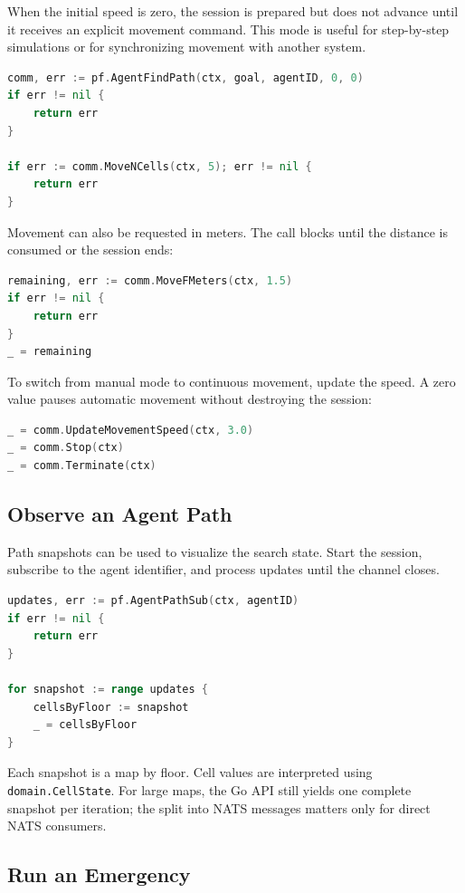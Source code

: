 \documentclass[12pt,a4paper]{report}
\begin{document}
When the initial speed is zero, the session is prepared but does not advance
until it receives an explicit movement command. This mode is useful for
step-by-step simulations or for synchronizing movement with another system.

\begin{lstlisting}[language=Go]
comm, err := pf.AgentFindPath(ctx, goal, agentID, 0, 0)
if err != nil {
    return err
}

if err := comm.MoveNCells(ctx, 5); err != nil {
    return err
}
\end{lstlisting}

Movement can also be requested in meters. The call blocks until the distance is
consumed or the session ends:

\begin{lstlisting}[language=Go]
remaining, err := comm.MoveFMeters(ctx, 1.5)
if err != nil {
    return err
}
_ = remaining
\end{lstlisting}

To switch from manual mode to continuous movement, update the speed. A zero
value pauses automatic movement without destroying the session:

\begin{lstlisting}[language=Go]
_ = comm.UpdateMovementSpeed(ctx, 3.0)
_ = comm.Stop(ctx)
_ = comm.Terminate(ctx)
\end{lstlisting}

\subsection{Observe an Agent Path}

Path snapshots can be used to visualize the search state. Start the session,
subscribe to the agent identifier, and process updates until the channel closes.

\begin{lstlisting}[language=Go]
updates, err := pf.AgentPathSub(ctx, agentID)
if err != nil {
    return err
}

for snapshot := range updates {
    cellsByFloor := snapshot
    _ = cellsByFloor
}
\end{lstlisting}

Each snapshot is a map by floor. Cell values are interpreted using
\texttt{domain.CellState}.
For large maps, the Go API still yields one complete snapshot per iteration; the
split into NATS messages matters only for direct NATS consumers.

\subsection{Run an Emergency}
\end{document}
